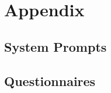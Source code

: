 \section*{Appendix}




\subsection*{System Prompts}



\clearpage



\newpage
\subsection*{Questionnaires}

